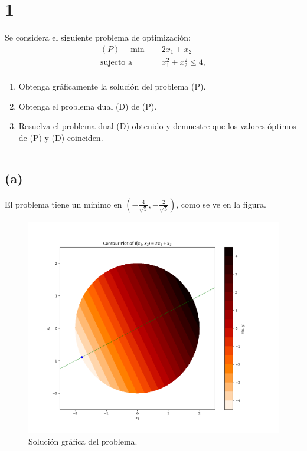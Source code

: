 \section*{1}

Se considera el siguiente problema de optimización:
\begin{equation*}
\begin{aligned}
    (P) \quad \min \quad & 2 x_1 + x_2 \\
    \text{sujecto a} \quad & x_1^2 + x_2^2 \leq 4, \\
\end{aligned}
\end{equation*}

\begin{enumerate}[label=(\alph*)]
    \item Obtenga gráficamente la solución del problema (P).
    \item Obtenga el problema dual (D) de (P). 
    \item Resuelva el problema dual (D) obtenido y demuestre que los valores óptimos de (P) y (D) coinciden.
\end{enumerate}

\noindent\rule{10cm}{0.4pt}

\subsection*{(a)}

El problema tiene un minimo en $\left(-\frac{4}{\sqrt{5}}, -\frac{2}{\sqrt{5}}\right)$, como se ve en la figura.
\begin{figure}[h]
\centering
\includegraphics[scale=0.6]{ex1_solution.png}
\caption{Solución gráfica del problema.}
\label{ex1_solution}
\end{figure}

